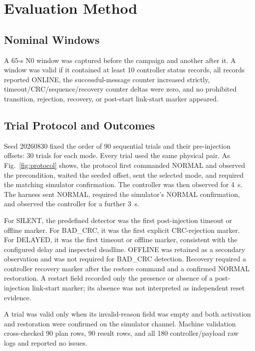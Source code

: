 \documentclass[conference]{IEEEtran}
\begin{document}
\section{Evaluation Method}

\subsection{Nominal Windows}

A 65-s N0 window was captured before the campaign and another after it. A window was valid if it contained at least 10 controller status records, all records reported ONLINE, the successful-message counter increased strictly, timeout/CRC/sequence/recovery counter deltas were zero, and no prohibited transition, rejection, recovery, or post-start link-start marker appeared.

\subsection{Trial Protocol and Outcomes}

Seed 20260830 fixed the order of 90 sequential trials and their pre-injection offsets: 30 trials for each mode. Every trial used the same physical pair. As Fig.~\ref{fig:protocol} shows, the protocol first commanded NORMAL and observed the precondition, waited the seeded offset, sent the selected mode, and required the matching simulator confirmation. The controller was then observed for 4~s. The harness sent NORMAL, required the simulator's NORMAL confirmation, and observed the controller for a further 3~s.

For SILENT, the predefined detector was the first post-injection timeout or offline marker. For BAD\_CRC, it was the first explicit CRC-rejection marker. For DELAYED, it was the first timeout or offline marker, consistent with the configured delay and inspected deadline. OFFLINE was retained as a secondary observation and was not required for BAD\_CRC detection. Recovery required a controller recovery marker after the restore command and a confirmed NORMAL restoration. A restart field recorded only the presence or absence of a post-injection link-start marker; its absence was not interpreted as independent reset evidence.

A trial was valid only when its invalid-reason field was empty and both activation and restoration were confirmed on the simulator channel. Machine validation cross-checked 90 plan rows, 90 result rows, and all 180 controller/payload raw logs and reported no issues.
\end{document}
